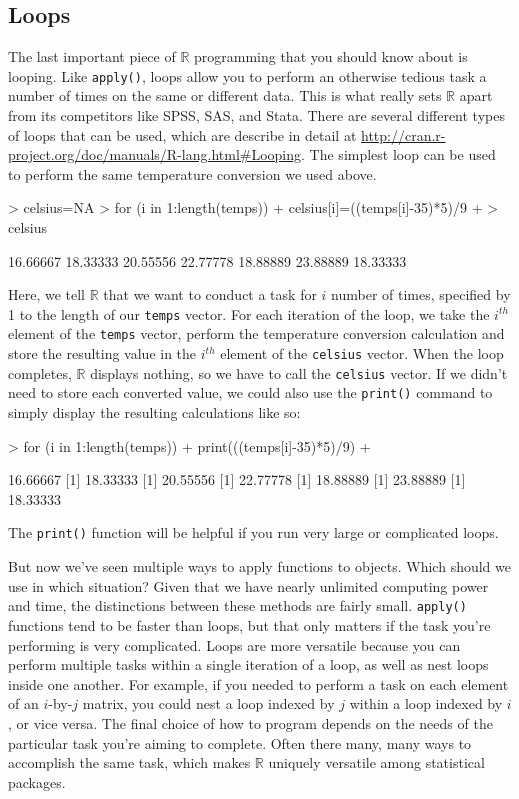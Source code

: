 \documentclass[12pt]{article}
\begin{document}
\subsection{Loops}
The last important piece of $\mathbb{R}$ programming that you should know about is looping. Like \verb|apply()|, loops allow you to perform an otherwise tedious task a number of times on the same or different data. This is what really sets $\mathbb{R}$ apart from its competitors like SPSS, SAS, and Stata. There are several different types of loops that can be used, which are describe in detail at \url{http://cran.r-project.org/doc/manuals/R-lang.html#Looping}. The simplest loop can be used to perform the same temperature conversion we used above.
\begin{Schunk}
\begin{Sinput}
> celsius=NA
> for (i in 1:length(temps)) {
+ 	celsius[i]=((temps[i]-35)*5)/9
+ }
> celsius
\end{Sinput}
\begin{Soutput}
[1] 16.66667 18.33333 20.55556 22.77778 18.88889 23.88889 18.33333
\end{Soutput}
\end{Schunk}
Here, we tell $\mathbb{R}$ that we want to conduct a task for $i$ number of times, specified by 1 to the length of our \verb|temps| vector. For each iteration of the loop, we take the $i^{th}$ element of the \verb|temps| vector, perform the temperature conversion calculation and store the resulting value in the $i^{th}$ element of the \verb|celsius| vector. When the loop completes, $\mathbb{R}$ displays nothing, so we have to call the \verb|celsius| vector. If we didn't need to store each converted value, we could also use the \verb|print()| command to simply display the resulting calculations like so:
\begin{Schunk}
\begin{Sinput}
> for (i in 1:length(temps)) {
+ 	print(((temps[i]-35)*5)/9)
+ }
\end{Sinput}
\begin{Soutput}
[1] 16.66667
[1] 18.33333
[1] 20.55556
[1] 22.77778
[1] 18.88889
[1] 23.88889
[1] 18.33333
\end{Soutput}
\end{Schunk}
The \verb|print()| function will be helpful if you run very large or complicated loops.

But now we've seen multiple ways to apply functions to objects. Which should we use in which situation? Given that we have nearly unlimited computing power and time, the distinctions between these methods are fairly small. \verb|apply()| functions tend to be faster than loops, but that only matters if the task you're performing is very complicated. Loops are more versatile because you can perform multiple tasks within a single iteration of a loop, as well as nest loops inside one another. For example, if you needed to perform a task on each element of an $i$-by-$j$ matrix, you could nest a loop indexed by $j$ within a loop indexed by $i$, or vice versa. The final choice of how to program depends on the needs of the particular task you're aiming to complete. Often there many, many ways to accomplish the same task, which makes $\mathbb{R}$ uniquely versatile among statistical packages.
\end{document}
